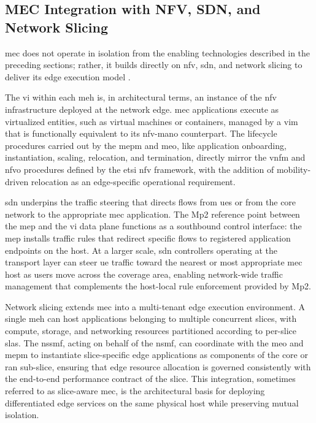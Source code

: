 \subsection{MEC Integration with NFV, SDN, and Network Slicing}

\ac{mec} does not operate in isolation from the enabling technologies described in the preceding sections; rather, it builds directly on \ac{nfv}, \ac{sdn}, and network slicing to deliver its edge execution model \cite{DouchEdgeComputingTechnologyEnablersSystematic2022}.

The \ac{vi} within each \ac{meh} is, in architectural terms, an instance of the \ac{nfv} infrastructure deployed at the network edge. \ac{mec} applications execute as virtualized entities, such as virtual machines or containers, managed by a \ac{vim} that is functionally equivalent to its \ac{nfv}-\ac{mano} counterpart. The lifecycle procedures carried out by the \ac{mepm} and \ac{meo}, like application onboarding, instantiation, scaling, relocation, and termination, directly mirror the \ac{vnfm} and \ac{nfvo} procedures defined by the \ac{etsi} \ac{nfv} framework, with the addition of mobility-driven relocation as an edge-specific operational requirement.

\ac{sdn} underpins the traffic steering that directs flows from \acp{ue} or from the core network to the appropriate \ac{mec} application. The Mp2 reference point between the \ac{mep} and the \ac{vi} data plane functions as a southbound control interface: the \ac{mep} installs traffic rules that redirect specific flows to registered application endpoints on the host. At a larger scale, \ac{sdn} controllers operating at the transport layer can steer \ac{ue} traffic toward the nearest or most appropriate \ac{mec} host as users move across the coverage area, enabling network-wide traffic management that complements the host-local rule enforcement provided by Mp2.

Network slicing extends \ac{mec} into a multi-tenant edge execution environment. A single \ac{meh} can host applications belonging to multiple concurrent slices, with compute, storage, and networking resources partitioned according to per-slice \acp{sla}. The \ac{nssmf}, acting on behalf of the \ac{nsmf}, can coordinate with the \ac{meo} and \ac{mepm} to instantiate slice-specific edge applications as components of the core or \ac{ran} sub-slice, ensuring that edge resource allocation is governed consistently with the end-to-end performance contract of the slice. This integration, sometimes referred to as slice-aware \ac{mec}, is the architectural basis for deploying differentiated edge services on the same physical host while preserving mutual isolation.


